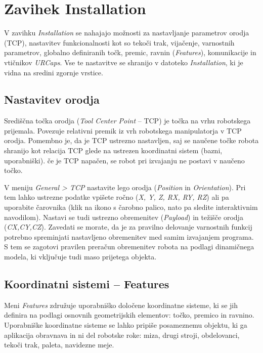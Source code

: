 \section{Zavihek Installation}

V zavihku  \emph{Installation} se nahajajo možnosti za nastavljanje parametrov orodja (TCP), nastavitev funkcionalnosti kot so tekoči trak, vijačenje, varnostnih parametrov, globalno definiranih točk, premic, ravnin (\emph{Features}), komunikacije in vtičnikov \emph{URCaps}. Vse te nastavitve se shranijo v datoteko \emph{Installation}, ki je vidna na sredini zgornje vrstice.

\subsection{Nastavitev orodja}

Središčna točka orodja (\emph{Tool Center Point} -- TCP)  je točka na vrhu robotskega prijemala. Povezuje relativni premik iz vrh robotskega manipulatorja v TCP orodja. Pomembno je, da je TCP ustrezno nastavljen, saj se naučene točke robota shranijo kot relacija TCP glede na ustrezen koordinatni sistem (bazni, uporabniški). če je TCP napačen, se robot pri izvajanju ne postavi v naučeno točko.

V meniju \emph{General > TCP} nastavite lego orodja (\emph{Position} in \emph{Orientation}). Pri tem lahko ustrezne podatke vpišete ročno (\emph{X, Y, Z, RX, RY, RZ}) ali pa uporabite čarovnika (klik na ikono s čarobno palico, nato pa sledite interaktivnim navodilom). Nastavi se tudi ustrezno obremenitev (\emph{Payload}) in težišče orodja (\emph{CX,CY,CZ}). Zavedati se morate, da je za pravilno delovanje varnostnih funkcij potrebno spreminjati nastavljeno obremenitev med samim izvajanjem programa. S tem se zagotovi pravilen preračun obremenitev robota na podlagi dinamičnega modela, ki vključuje tudi maso prijetega objekta.



\subsection{Koordinatni sistemi -- Features}

Meni \emph{Features} združuje uporabniško določene koordinatne sisteme, ki se jih definira na podlagi osnovnih geometrijskih elementov: točko, premico in ravnino. Uporabniške koordinatne sisteme se lahko pripiše posameznemu objektu, ki ga aplikacija obravnava in ni del robotske roke: miza, drugi stroji, obdelovanci, tekoči trak, paleta, navidezne meje.

